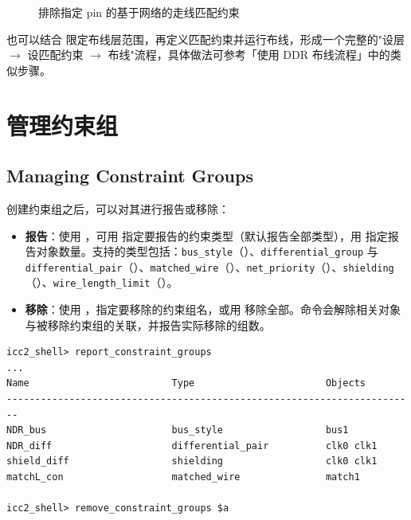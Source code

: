 \begin{figure}[htbp]
\centering
{}
\caption{排除指定 pin 的基于网络的走线匹配约束}
\label{fig:net-matching-exclusion}
\end{figure}

也可以结合  限定布线层范围，再定义匹配约束并运行布线，形成一个完整的"设层 $\to$ 设匹配约束 $\to$ 布线"流程，具体做法可参考「使用 DDR 布线流程」中的类似步骤。

\section{管理约束组}
\subsection*{Managing Constraint Groups}

创建约束组之后，可以对其进行报告或移除：
\begin{itemize}
  \item \textbf{报告}：使用 ，可用  指定要报告的约束类型（默认报告全部类型），用  指定报告对象数量。支持的类型包括：\texttt{bus\_style}（）、\texttt{differential\_group} 与 \texttt{differential\_pair}（）、\texttt{matched\_wire}（）、\texttt{net\_priority}（）、\texttt{shielding}（）、\texttt{wire\_length\_limit}（）。
  \item \textbf{移除}：使用 ，指定要移除的约束组名，或用  移除全部。命令会解除相关对象与被移除约束组的关联，并报告实际移除的组数。
\end{itemize}

\begin{lstlisting}
icc2_shell> report_constraint_groups
...
Name                         Type                       Objects
------------------------------------------------------------------------
NDR_bus                      bus_style                  bus1
NDR_diff                     differential_pair          clk0 clk1
shield_diff                  shielding                  clk0 clk1
matchL_con                   matched_wire               match1

icc2_shell> remove_constraint_groups $a
\end{lstlisting}

